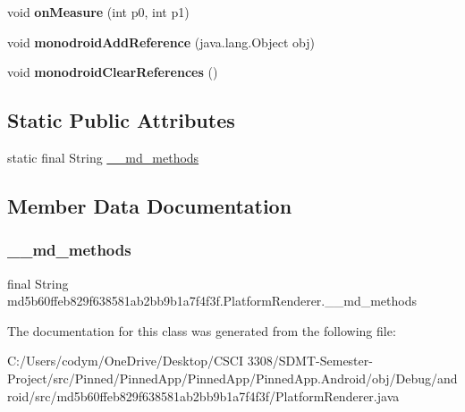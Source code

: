 \begin{DoxyCompactItemize}
void {\bfseries on\+Measure} (int p0, int p1)
\item 
\mbox{\label{classmd5b60ffeb829f638581ab2bb9b1a7f4f3f_1_1_platform_renderer_a35f1c22f204eb1766115df1f3ea8ebf8}} 
void {\bfseries monodroid\+Add\+Reference} (java.\+lang.\+Object obj)
\item 
\mbox{\label{classmd5b60ffeb829f638581ab2bb9b1a7f4f3f_1_1_platform_renderer_a1c34b6a1a7883025d993d09095c6ee67}} 
void {\bfseries monodroid\+Clear\+References} ()
\end{DoxyCompactItemize}
\subsection*{Static Public Attributes}
\begin{DoxyCompactItemize}
\item 
static final String \hyperlink{classmd5b60ffeb829f638581ab2bb9b1a7f4f3f_1_1_platform_renderer_ab4ebc79b3f389fb8fc2cf5953db2bf42}{\+\_\+\+\_\+md\+\_\+methods}
\end{DoxyCompactItemize}


\subsection{Member Data Documentation}
\mbox{\label{classmd5b60ffeb829f638581ab2bb9b1a7f4f3f_1_1_platform_renderer_ab4ebc79b3f389fb8fc2cf5953db2bf42}} 
\subsubsection{\texorpdfstring{\+\_\+\+\_\+md\+\_\+methods}{\_\_md\_methods}}
{\footnotesize\ttfamily final String md5b60ffeb829f638581ab2bb9b1a7f4f3f.\+Platform\+Renderer.\+\_\+\+\_\+md\+\_\+methods\hspace{0.3cm}{\ttfamily [static]}}



The documentation for this class was generated from the following file\+:\begin{DoxyCompactItemize}
\item 
C\+:/\+Users/codym/\+One\+Drive/\+Desktop/\+C\+S\+C\+I 3308/\+S\+D\+M\+T-\/\+Semester-\/\+Project/src/\+Pinned/\+Pinned\+App/\+Pinned\+App/\+Pinned\+App.\+Android/obj/\+Debug/android/src/md5b60ffeb829f638581ab2bb9b1a7f4f3f/Platform\+Renderer.\+java\end{DoxyCompactItemize}
